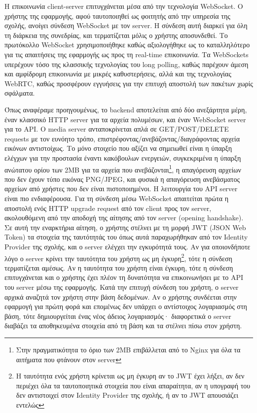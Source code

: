 \documentclass[../thesis.tex]{subfiles}
\begin{document}
Η επικοινωνία client-server επιτυγχάνεται μέσα από την τεχνολογία WebSocket.
Ο χρήστης της εφαρμογής, αφού ταυτοποιηθεί ως φοιτητής από την υπηρεσία της σχολής, ανοίγει σύνδεση WebSocket με τον server.
Η σύνδεση αυτή διαρκεί για όλη τη διάρκεια της συνεδρίας, και τερματίζεται μόλις ο χρήστης αποσυνδεθεί.
Το πρωτόκολλο WebSocket χρησιμοποιήθηκε καθώς αξιολογήθηκε ως το καταλληλότερο για τις απαιτήσεις της εφαρμογής ως προς τη real-time επικοινωνία.
Τα WebSockets υπερέχουν τόσο της κλασσικής τεχνολογίας του long polling, καθώς παρέχουν άμεση και αμφίδρομη επικοινωνία με μικρές καθυστερήσεις, αλλά και της τεχνολογίας WebRTC, καθώς προσφέρουν εγγυήσεις για την επιτυχή αποστολή των πακέτων χωρίς σφάλματα.

Όπως αναφέραμε προηγουμένως, το backend αποτελείται από δύο ανεξάρτητα μέρη, έναν κλασσικό HTTP server για τα αρχεία πολυμέσων, και έναν WebSocket server για το API.
Ο media server ανταποκρίνεται απλά σε GET/POST/DELETE requests με τον ευνόητο τρόπο, επιστρέφοντας/ανεβάζοντας/διαγράφοντας αρχεία εικόνων αντιστοίχως.
Το μόνο στοιχείο που αξίζει να σημειωθεί είναι η ύπαρξη ελέγχων για την προστασία έναντι κακόβουλων ενεργειών, συγκεκριμένα η ύπαρξη ανώτατου ορίου των 2MB για τα αρχεία που ανεβάζονται\footnote{Στην πραγματικότητα το όριο των 2MB επιβάλλεται από το Nginx για όλα τα αιτήματα που φτάνουν στον server}, η απαγόρευση αρχείων που δεν έχουν τύπο εικόνας PNG/JPEG, και φυσικά η απαγόρευση ανεβάσματος αρχείων από χρήστες που δεν είναι πιστοποιημένοι.
Η λειτουργία του API server είναι πιο ενδιαφέρουσα.
Για τη σύνδεση μέσω WebSocket απαιτείται πρώτα η αποστολή ενός HTTP upgrade request από τον client προς τον server, ακολουθόμενη από την αποδοχή της αίτησης από τον server (opening handshake).
Σε αυτή την εναρκτήρια αίτηση, ο χρήστης στέλνει με τη μορφή JWT (JSON Web Token) τα στοιχεία της ταυτότητάς του όπως αυτά παραχωρήθηκαν από τον Identity Provider της σχολής, και ο server ελέγχει την εγκυρότητά τους.
Αν για οποιονδήποτε λόγο ο server κρίνει την ταυτότητα του χρήστη ως μη έγκυρη\footnote{Η ταυτότητα ενός χρήστη κρίνεται ως μη έγκυρη αν το JWT έχει λήξει, αν δεν περιέχει όλα τα ταυτοποιητικά στοιχεία που είναι απαραίτητα, αν η υπογραφή του δεν αντιστοιχεί στον Identity Provider της σχολής, ή αν το JWT απουσιάζει εντελώς}, τότε η σύνδεση τερματίζεται αμέσως.
Αν η ταυτότητα του χρήστη είναι έγκυρη, τότε η σύνδεση επιτυγχάνεται και ο χρήστης έχει πλέον τη δυνατότητα να επικοινωνήσει με το API του server μέσω της εφαρμογής.
Κατά την επιτυχή σύνδεση του χρήστη, ο server αρχικά αναζητά τον χρήστη στην βάση δεδομένων.
Αν ο χρήστης συνδέεται στην εφαρμογή για πρώτη φορά και επομένως δεν υπάρχει ο αντίστοιχος λογαριασμός στη βάση, τότε δημιουργείται ένας νέος άδειος λογαριασμός· διαφορετικά ο server διαβάζει τα αποθηκευμένα στοιχεία από τη βάση και τα στέλνει πίσω στον χρήστη.
\end{document}
